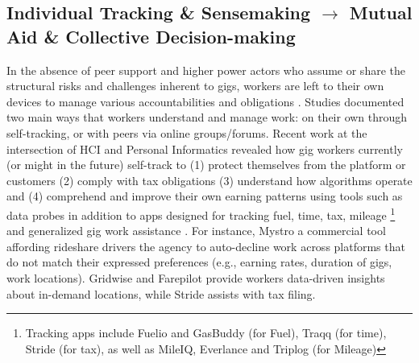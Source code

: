 \subsection{{Individual Tracking \& Sensemaking $\rightarrow$ Mutual Aid \& Collective Decision-making}}
In the absence of peer support and higher power actors who assume or share the structural risks and challenges inherent to gigs, workers are left to their own devices to manage {various} accountabilities {and obligations} \cite{consent, indie, accountable}. 
Studies documented two main ways that workers understand and manage work: on their own through self-tracking, or with peers via online groups/forums. 
Recent work at the intersection of HCI and Personal Informatics revealed how gig workers currently (or might in the future) self-track to (1) protect themselves from the platform \cite{privacy} or customers \cite{visibility, sousveillance} (2) comply with tax obligations \cite{tax_lives, taxing} (3) understand how algorithms operate \cite{sousveillance, zhang2023stakeholder} and (4) comprehend and improve their own earning patterns \cite{zhang2023stakeholder, accountable, supporting} using tools such as data probes {in addition to apps designed for tracking fuel, time, tax, mileage \footnote{Tracking apps include Fuelio and GasBuddy (for Fuel), Traqq (for time), Stride (for tax), as well as MileIQ, Everlance and Triplog (for Mileage)} and generalized gig work assistance \cite{accountable}. For instance, Mystro a commercial tool affording rideshare drivers the agency to auto-decline work across platforms that do not match their expressed preferences (e.g., earning rates, duration of gigs, work locations). 
Gridwise and Farepilot provide workers data-driven insights about in-demand locations, while Stride assists with tax filing. } 

